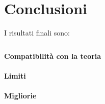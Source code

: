 \section{Conclusioni}

\noindent I risultati finali sono:
\[
\begin{aligned}
\end{aligned}
\]

\paragraph{Compatibilità con la teoria}


\paragraph{Limiti}


\paragraph{Migliorie}

